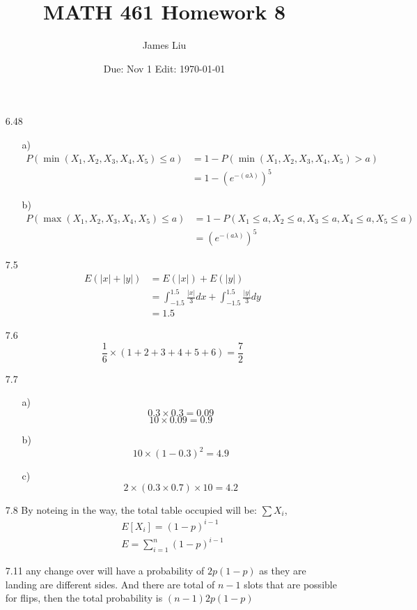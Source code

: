 \documentclass{article}
\date{Due: Nov 1 Edit: \today}
\title{MATH 461 Homework 8}
\author{James Liu}
\begin{document}
\maketitle
\begin{itemize}
    \item [6.48]
    \begin{itemize}
        \item [a)]
        \begin{align*}
            P(\min(X_1,X_2,X_3,X_4,X_5)\leq a)&=1-P(\min(X_1,X_2,X_3,X_4,X_5)>a)\\
            &=1-(e^{-(a\lambda)})^5
        \end{align*}
        \item [b)]
        \begin{align*}
            P(\max(X_1,X_2,X_3,X_4,X_5)\leq a)&=1-P(X_1\leq a,X_2\leq a,X_3\leq a,X_4\leq a,X_5\leq a)\\
            &=(e^{-(a\lambda)})^5
        \end{align*}
    \end{itemize}
    \item [7.5]
    \begin{align*}
        E(|x|+|y|)&=E(|x|)+E(|y|)\\
        &=\int_{-1.5}^{1.5}\frac{|x|}{3}dx+\int_{-1.5}^{1.5}\frac{|y|}{3}dy\\
        &=1.5
    \end{align*}
    \item [7.6] \[\frac{1}{6}\times(1+2+3+4+5+6)=\frac{7}{2}\]
    \item [7.7]
    \begin{itemize}
        \item [a)]
        \[0.3\times0.3=0.09\]
        \[10\times 0.09 = 0.9\]
        \item [b)]
        \[10\times (1-0.3)^2=4.9\]
        \item [c)]
        \[2\times (0.3\times 0.7)\times 10 = 4.2\]
    \end{itemize}
    \item [7.8]
    By noteing in the way, the total table occupied will be: \(\sum X_i\), 
    \begin{align*}
        E[X_i] = (1-p)^{i-1}\\
        E = \sum_{i=1}^{n}(1-p)^{i-1}
    \end{align*}
    \item [7.11]
    any change over will have a probability of \(2p(1-p)\) as they are landing are different sides. And there are total of \(n-1\) slots that are possible for flips, then the total probability is \((n-1)2p(1-p)\)

\end{itemize}
\end{document}

